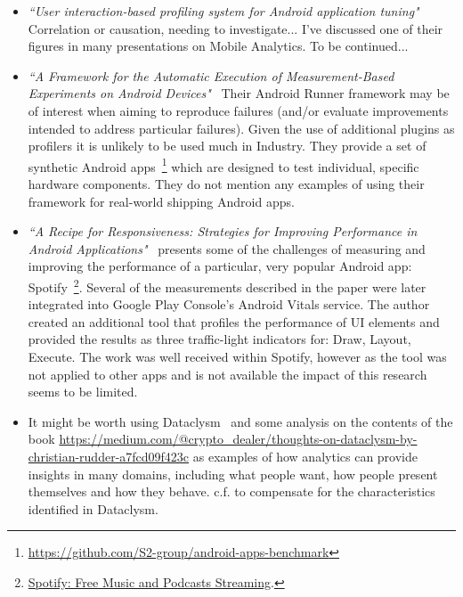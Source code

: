 \begin{itemize}
    \item \emph{``User interaction-based profiling system for Android application tuning"}~\citep{lee2014_user_interaction_based_profiling_system_for_android_app_tuning} Correlation or causation, needing to investigate... I've discussed one of their figures in many presentations on Mobile Analytics. To be continued...
    
    \item \emph{``A Framework for the Automatic Execution of Measurement-Based Experiments on Android Devices"}~\citep{malavolta2020_android_runner} Their Android Runner framework may be of interest when aiming to reproduce failures (and/or evaluate improvements intended to address particular failures). Given the use of additional plugins as profilers it is unlikely to be used much in Industry. They provide a set of synthetic Android apps~\footnote{\url{https://github.com/S2-group/android-apps-benchmark}} which are designed to test individual, specific hardware components. They do not mention any examples of using their framework for real-world shipping Android apps.
    
    \item \emph{``A Recipe for Responsiveness: Strategies for Improving Performance in Android Applications"}~\citep{nilsson2016_a_recipe_for_responsiveness_for_improving_android_apps_spotify_masters} presents some of the challenges of measuring and improving the performance of a particular, very popular Android app: Spotify~\footnote{\href{https://play.google.com/store/apps/details?id=com.spotify.music&hl=en_GB&gl=US}{Spotify: Free Music and Podcasts Streaming}.}. Several of the measurements described in the paper were later integrated into Google Play Console's Android Vitals service. The author created an additional tool that profiles the performance of UI elements and provided the results as three traffic-light indicators for: Draw, Layout, Execute. The work was well received within Spotify, however as the tool was not applied to other apps and is not available the impact of this research seems to be limited.
    
    \item It might be worth using Dataclysm~\citep{rudder2014dataclysm} and some analysis on the contents of the book \url{https://medium.com/@crypto_dealer/thoughts-on-dataclysm-by-christian-rudder-a7fcd09f423c} as examples of how analytics can provide insights in many domains, including what people want, how people present themselves and how they behave. c.f. \citep{GAVIDIACALDERON2021_game_theoretic_analysis_of_software_development_practices} to compensate for the characteristics identified in Dataclysm.
    
\end{itemize}

